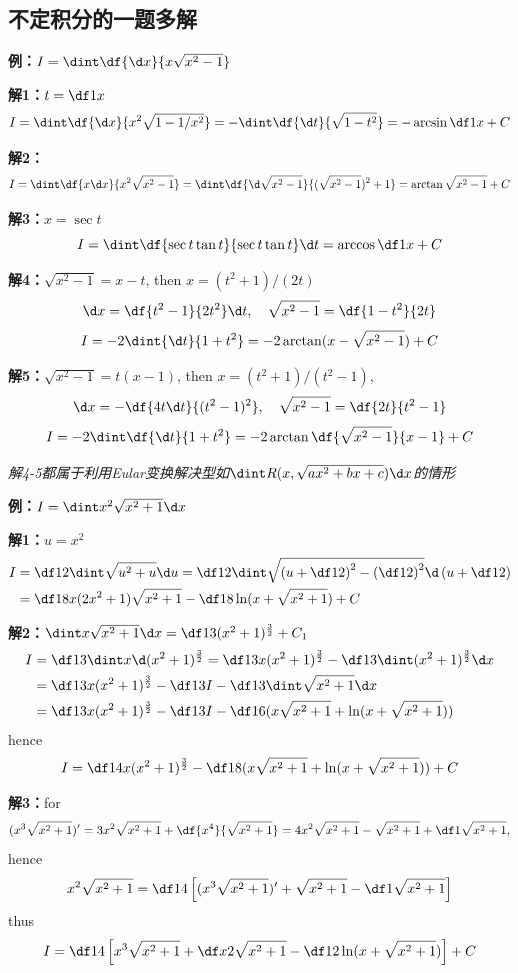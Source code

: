 \newpage

\begin{shaded}

\section*{不定积分的一题多解}

{\bf 例：}$I=\dint\df{\d x}{x\sqrt{x^2-1}}$

{\bf 解1：}$t=\df1x$
$$I=\dint\df{\d x}{x^2\sqrt{1-1/x^2}}=-\dint\df{\d t}{\sqrt{1-t^2}}
=-\arcsin\df1x+C$$

{\bf 解2：}
$$I=\dint\df{x\d x}{x^2\sqrt{x^2-1}}=\dint\df{\d\sqrt{x^2-1}}
{(\sqrt{x^2-1})^2+1}=\arctan\sqrt{x^2-1}+C$$

{\bf 解3：}$x=\sec t$
$$I=\dint\df{\sec t\tan t}{\sec t\tan t}\d t=\arccos\df1x+C$$

{\bf 解4：}$\sqrt{x^2-1}=x-t$, then $x=(t^2+1)/(2t)$
$$\d x=\df{t^2-1}{2t^2}\d t,\quad \sqrt{x^2-1}=\df{1-t^2}{2t}$$
$$I=-2\dint{\d t}{1+t^2}=-2\arctan(x-\sqrt{x^2-1})+C$$

{\bf 解5：}$\sqrt{x^2-1}=t(x-1)$, then $x=(t^2+1)/(t^2-1)$,
$$\d x=-\df{4t\d t}{(t^2-1)^2},\quad \sqrt{x^2-1}=\df{2t}{t^2-1}$$
$$I=-2\dint\df{\d t}{1+t^2}=-2\arctan\df{\sqrt{x^2-1}}{x-1}+C$$

{\it 解4-5都属于利用Eular变换解决型如$\dint R(x,\sqrt{ax^2+bx+c})\d x$的情形}

{\bf 例：}$I=\dint x^2\sqrt{x^2+1}\d x$

{\bf 解1：}$u=x^2$
\begin{align}
I&=\df12\dint\sqrt{u^2+u}\d u=\df12\dint\sqrt{\left(u+\df12\right)^2
-\left(\df12\right)^2}\d\left(u+\df12\right)\notag\\
&=\df18x(2x^2+1)\sqrt{x^2+1}-\df18\ln(x+\sqrt{x^2+1})+C\notag
\end{align}

{\bf 解2：}$\dint x\sqrt{x^2+1}\d x=\df13(x^2+1)^{\frac32}+C_1$
\begin{align}
I&=\df13\dint x\d(x^2+1)^{\frac32}=\df13 x(x^2+1)^{\frac32}
-\df13\dint(x^2+1)^{\frac32}\d x\notag\\
&=\df13x(x^2+1)^{\frac32}-\df13I-\df13\dint\sqrt{x^2+1}\d x\notag\\
&=\df13x(x^2+1)^{\frac32}-\df13I-\df16(x\sqrt{x^2+1}
+\ln(x+\sqrt{x^2+1}))\notag
\end{align}
hence
$$I=\df14x(x^2+1)^{\frac32}-\df18(x\sqrt{x^2+1}
+\ln(x+\sqrt{x^2+1}))+C$$

{\bf 解3：}for
$$(x^3\sqrt{x^2+1})'=3x^2\sqrt{x^2+1}+\df{x^4}{\sqrt{x^2+1}}
=4x^2\sqrt{x^2+1}-\sqrt{x^2+1}+\df1{\sqrt{x^2+1}},$$
hence
$$x^2\sqrt{x^2+1}=\df14\left[(x^3\sqrt{x^2+1})'+\sqrt{x^2+1}
-\df1{\sqrt{x^2+1}}\right]$$
thus
$$I=\df14\left[x^3\sqrt{x^2+1}+\df x2\sqrt{x^2+1}
-\df12\ln(x+\sqrt{x^2+1})\right]+C$$
\end{shaded}

